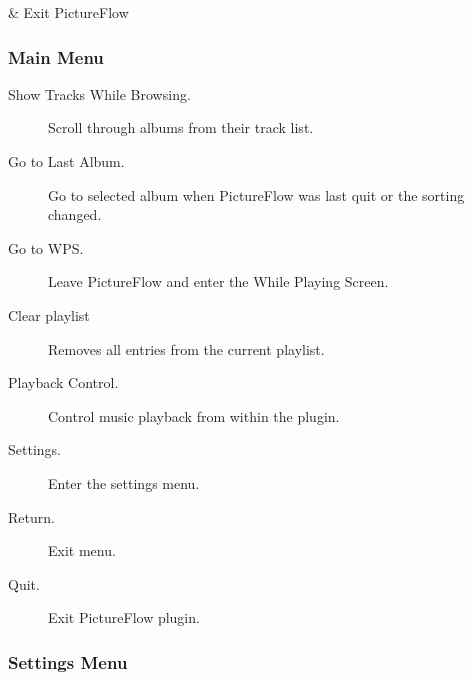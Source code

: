 \begin{btnmap}
            &
        Exit PictureFlow
            \\

    \end{btnmap}

\subsubsection{Main Menu}
\begin{description}
  \item[Show Tracks While Browsing.] Scroll through albums from their track list.
  \item[Go to Last Album.] Go to selected album when PictureFlow was last quit or the sorting changed.
  \item[Go to WPS.] Leave PictureFlow and enter the While Playing Screen.
  \item[Clear playlist] Removes all entries from the current playlist.
  \item[Playback Control.] Control music playback from within the plugin.
  \item[Settings.] Enter the settings menu.
  \item[Return.] Exit menu.
  \item[Quit.] Exit PictureFlow plugin.
\end{description}

\subsubsection{Settings Menu}

